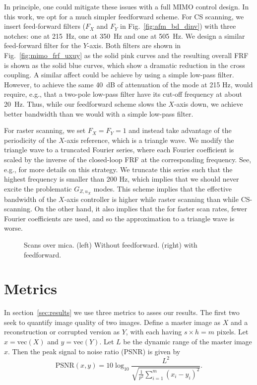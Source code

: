 \documentclass[twocolumn,oneside]{IEEEtran/IEEEtran}
\begin{document}
In principle, one could mitigate these issues with a full MIMO control design. In this work, we opt for a much simpler feedforward scheme.
For CS scanning, we insert feed-forward filters ($F_X$ and $F_Y$ in Fig.~\ref{fig:afm_bd_dinv}) with three notches: one at 215~Hz, one at 350~Hz and one at 505~Hz. We design a similar feed-forward filter for the $Y$-axis. Both filters are shown in Fig.~\ref{fig:mimo_frf_uxuy} as the solid pink curves and the resulting overall FRF is shown as the solid blue curves, which show a dramatic reduction in the cross coupling. A similar affect could be achieve by using a simple low-pass filter. However, to achieve the same 40~dB of attenuation of the mode at 215 Hz, would require, e.g., that a two-pole low-pass filter have its cut-off frequency at about 20~Hz. Thus, while our feedforward scheme slows the $X$-axis down, we achieve better bandwidth than we would with a simple low-pass filter.

For raster scanning, we set $F_X=F_Y=1$ and instead take advantage of the periodicity of the $X$-axis reference, which is a triangle wave. We modify the triangle wave to a truncated Fourier series, where each Fourier coefficient is scaled by the inverse of the closed-loop FRF at the corresponding frequency. See, e.g., \cite{clayton_review_2009} for more details on this strategy. We truncate this series such that the highest frequency is smaller than 200 Hz, which implies that we should never excite the problematic $G_{Z,u_X}$ modes. This scheme implies that the effective bandwidth of the $X$-axis controller is higher while raster scanning than while CS-scanning. On the other hand, it also implies that the for faster scan rates, fewer Fourier coefficients are used, and so the approximation to a triangle wave is worse.
\begin{figure}
  
  \caption{Scans over mica. (left) Without feedforward. (right) with feedforward.}
  \label{fig:with_ff}
\end{figure}


\section{Metrics}\label{sec:rdi}
In section~\ref{sec:results} we use three metrics to asses our results.
The first two seek to quantify image quality of two images. 
Define a master image as $X$ and a reconstruction or corrupted version as $Y$, with each having $s\times h=m$ pixels.
Let $x=\textrm{vec}(X)$ and $y=\textrm{vec}(Y)$. Let $L$ be the dynamic range of the master image $x$.
Then the peak signal to noise ratio (PSNR) is given by
\begin{equation*}
  \text{PSNR}(x,y) = 10\log_{10}\frac{L^2}
  {\sqrt{\frac{1}{p^2} \sum_{i=1}^{m}( x_{i} - y_{i})^2 }}.
\end{equation*}
\end{document}
